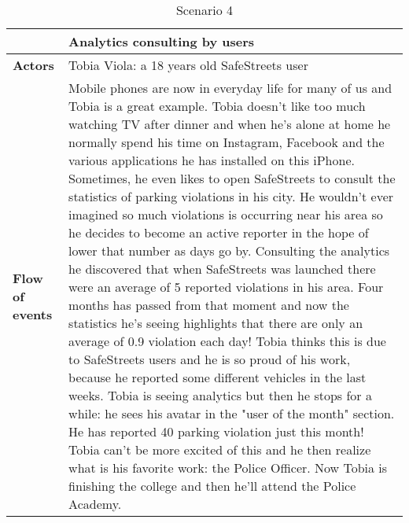 \begin{table}[!htbp]
	\centering
\begin{tabular}{lp{9cm}}
\hline
\bf\large  &\bf\large Analytics consulting by users\\
\hline
\hline

\bf Actors&Tobia Viola: a 18 years old SafeStreets user\\
\hline
\bf Flow of events&
Mobile phones are now in everyday life for many of us and Tobia is a great example. Tobia doesn't like too much watching TV after dinner and when he's alone at home he normally spend his time on Instagram, Facebook and the various applications he has installed on this iPhone.
Sometimes, he even likes to open SafeStreets to consult the statistics of parking violations in his city.
He wouldn't ever imagined so much violations is occurring near his area so he decides to become an active reporter in the hope of lower that number as days go by.
Consulting the analytics he discovered that when SafeStreets was launched there were an average of 5 reported violations in his area.
Four months has passed from that moment and now the statistics he's seeing highlights that there are only an average of 0.9 violation each day! 
Tobia thinks this is due to SafeStreets users and he is so proud of his work, because he reported some different vehicles in the last weeks.
Tobia is seeing analytics but then he stops for a while:  he sees his avatar in the "user of the month" section. He has reported 40 parking violation just this month!
Tobia can't be more excited of this and he then realize what is his favorite work: the Police Officer.  
Now Tobia is finishing the college and then he'll attend the Police Academy.
\end{tabular}
\caption{Scenario 4} 
\label{tab:scenariofour}
\end{table}